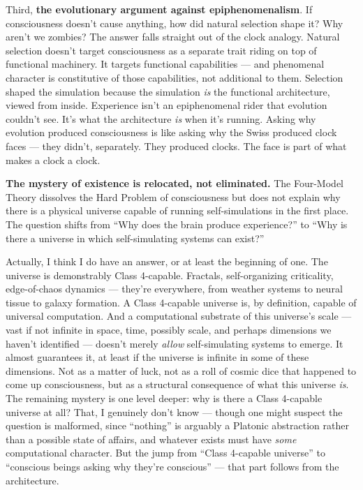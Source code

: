 \documentclass[11pt, twoside, openright]{book}
\begin{document}
Third, \textbf{the evolutionary argument against epiphenomenalism}. If consciousness doesn't cause anything, how did natural selection shape it? Why aren't we zombies? The answer falls straight out of the clock analogy. Natural selection doesn't target consciousness as a separate trait riding on top of functional machinery. It targets functional capabilities --- and phenomenal character is constitutive of those capabilities, not additional to them. Selection shaped the simulation because the simulation \textit{is} the functional architecture, viewed from inside. Experience isn't an epiphenomenal rider that evolution couldn't see. It's what the architecture \textit{is} when it's running. Asking why evolution produced consciousness is like asking why the Swiss produced clock faces --- they didn't, separately. They produced clocks. The face is part of what makes a clock a clock.

\textbf{The mystery of existence is relocated, not eliminated.} The Four-Model Theory dissolves the Hard Problem of consciousness but does not explain why there is a physical universe capable of running self-simulations in the first place. The question shifts from ``Why does the brain produce experience?'' to ``Why is there a universe in which self-simulating systems can exist?''

Actually, I think I do have an answer, or at least the beginning of one. The universe is demonstrably Class 4-capable. Fractals, self-organizing criticality, edge-of-chaos dynamics --- they're everywhere, from weather systems to neural tissue to galaxy formation. A Class 4-capable universe is, by definition, capable of universal computation. And a computational substrate of this universe's scale --- vast if not infinite in space, time, possibly scale, and perhaps dimensions we haven't identified --- doesn't merely \textit{allow} self-simulating systems to emerge. It almost guarantees it, at least if the universe is infinite in some of these dimensions. Not as a matter of luck, not as a roll of cosmic dice that happened to come up consciousness, but as a structural consequence of what this universe \textit{is}. The remaining mystery is one level deeper: why is there a Class 4-capable universe at all? That, I genuinely don't know --- though one might suspect the question is malformed, since ``nothing'' is arguably a Platonic abstraction rather than a possible state of affairs, and whatever exists must have \textit{some} computational character. But the jump from ``Class 4-capable universe'' to ``conscious beings asking why they're conscious'' --- that part follows from the architecture.
\end{document}

